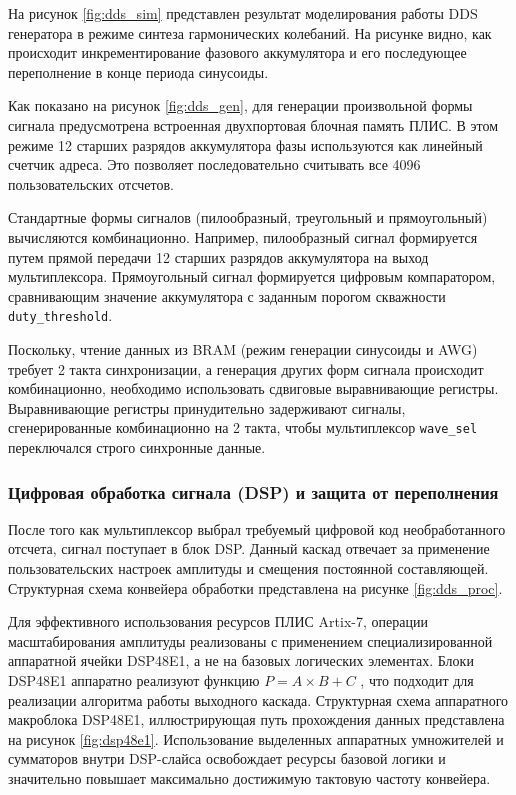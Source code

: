 \documentclass[12pt,a4paper,TimesNewRoman]{article}
\begin{document}
На рисунок \ref{fig:dds_sim} представлен результат моделирования работы DDS генератора в режиме синтеза гармонических колебаний. На рисунке видно, как происходит инкрементирование фазового аккумулятора и его последующее переполнение в конце периода синусоиды.

Как показано на рисунок \ref{fig:dds_gen}, для генерации произвольной формы сигнала предусмотрена встроенная двухпортовая блочная память ПЛИС. В этом режиме 12 старших разрядов аккумулятора фазы используются как линейный счетчик адреса. Это позволяет последовательно считывать все 4096 пользовательских отсчетов.

Стандартные формы сигналов (пилообразный, треугольный и прямоугольный) вычисляются комбинационно. Например, пилообразный сигнал формируется путем прямой передачи 12 старших разрядов аккумулятора на выход мультиплексора. Прямоугольный сигнал формируется цифровым компаратором, сравнивающим значение аккумулятора с заданным порогом скважности \texttt{duty\_threshold}.

Поскольку, чтение данных из BRAM (режим генерации синусоиды и AWG) требует 2 такта синхронизации, а генерация других форм сигнала происходит комбинационно, необходимо использовать сдвиговые выравнивающие регистры. Выравнивающие регистры принудительно задерживают сигналы, сгенерированные комбинационно на 2 такта, чтобы мультиплексор \texttt{wave\_sel} переключался строго синхронные данные.

\subsubsection{Цифровая обработка сигнала (DSP) и защита от переполнения}

После того как мультиплексор выбрал требуемый цифровой код необработанного отсчета, сигнал поступает в блок DSP. Данный каскад отвечает за применение пользовательских настроек амплитуды и смещения постоянной составляющей. Структурная схема конвейера обработки представлена на рисунке \ref{fig:dds_proc}.

Для эффективного использования ресурсов ПЛИС Artix-7, операции масштабирования амплитуды реализованы с применением специализированной аппаратной ячейки DSP48E1, а не на базовых логических элементах. Блоки DSP48E1 аппаратно реализуют функцию $P=A \times B + C$ \cite{dsp48e1}, что подходит для реализации алгоритма работы выходного каскада. Структурная схема аппаратного макроблока DSP48E1, иллюстрирующая путь прохождения данных представлена на рисунок \ref{fig:dsp48e1}. Использование выделенных аппаратных умножителей и сумматоров внутри DSP-слайса освобождает ресурсы базовой логики и значительно повышает максимально достижимую тактовую частоту конвейера.
\end{document}
